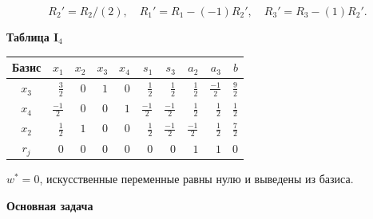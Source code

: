 \documentclass[12pt,a4paper]{article}
\begin{document}
\[R_{2}'=R_{2}/(2),\quad R_{1}'=R_{1}-(-1)R_{2}',\quad R_{3}'=R_{3}-(1)R_{2}'.\]
\par\textbf{Таблица I$_{4}$}\begin{center}\small\setlength{\tabcolsep}{4pt}\begin{tabular}{c|rrrrrrrr|r}\hline
Базис & $x_{1}$ & $x_{2}$ & $x_{3}$ & $x_{4}$ & $s_{1}$ & $s_{3}$ & $a_{2}$ & $a_{3}$ & $b$\\\hline
$x_{3}$ & $\frac{3}{2}$ & $0$ & $1$ & $0$ & $\frac{1}{2}$ & $\frac{1}{2}$ & $\frac{1}{2}$ & $\frac{-1}{2}$ & $\frac{9}{2}$\\
$x_{4}$ & $\frac{-1}{2}$ & $0$ & $0$ & $1$ & $\frac{-1}{2}$ & $\frac{-1}{2}$ & $\frac{1}{2}$ & $\frac{1}{2}$ & $\frac{1}{2}$\\
$x_{2}$ & $\frac{1}{2}$ & $1$ & $0$ & $0$ & $\frac{1}{2}$ & $\frac{-1}{2}$ & $\frac{-1}{2}$ & $\frac{1}{2}$ & $\frac{7}{2}$\\
\hline $r_j$ & $0$ & $0$ & $0$ & $0$ & $0$ & $0$ & $1$ & $1$ & $0$\\\hline\end{tabular}\end{center}
$w^*=0$, искусственные переменные равны нулю и выведены из базиса.
\newpage
\par\textbf{Основная задача}
\end{document}
